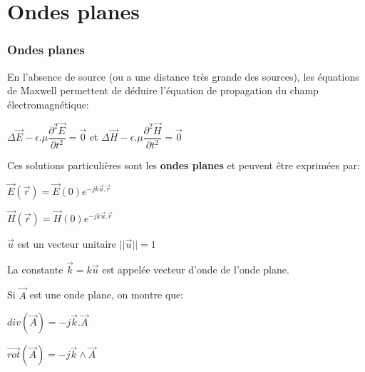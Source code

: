 \documentclass[
10pt,
aspectratio=169,
]{beamer}
\begin{document}
\section{Ondes planes}
\begin{frame} 
\frametitle{Ondes planes}

En l'absence de source (ou a une distance très grande des sources), les équations de Maxwell permettent de déduire l'équation de
propagation du champ électromagnétique:

\begin{center}
$\Delta \vec{E}-\epsilon.\mu\dfrac{\partial^2\vec{E}}{\partial t^2}=\vec{0}$ \hspace{1cm} et \hspace{1cm} $\Delta \vec{H}-\epsilon.\mu\dfrac{\partial^2\vec{H}}{\partial t^2}=\vec{0}$
\end{center}

Ces solutions particulières sont les \textbf{ondes planes} et peuvent être exprimées par:

\begin{center} \begin{tcolorbox}[colframe=red,width=7cm]
\center$\vec{E}(\vec{r})=\vec{E}(0)e^{-jk\vec{u}.\vec{r}}$

\vspace{0.5cm}
 $\vec{H}(\vec{r})=\vec{H}(0)e^{-jk\vec{u}.\vec{r}}$
\end{tcolorbox}\end{center}

$\vec{u}$ est un vecteur unitaire \hspace{1cm}$||\vec{u}||=1$

La constante $\vec{k}=k\vec{u}$ est appelée vecteur d'onde de l'onde plane.

Si $\vec{A}$ est une onde plane, on montre que:

\begin{center}
$div(\vec{A})=-j \vec{k}.\vec{A}$

$\vec{rot}(\vec{A})=-j \vec{k}\wedge\vec{A}$
\end{center}
\end{frame}

\end{document}
